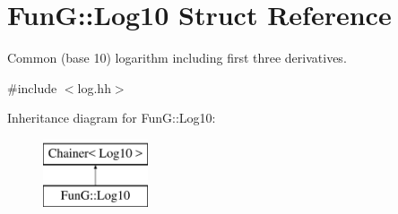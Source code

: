 \hypertarget{structFunG_1_1Log10}{\section{Fun\-G\-:\-:Log10 Struct Reference}
\label{structFunG_1_1Log10}
}


Common (base 10) logarithm including first three derivatives.  




{\ttfamily \#include $<$log.\-hh$>$}

Inheritance diagram for Fun\-G\-:\-:Log10\-:\begin{figure}[H]
\begin{center}
\leavevmode
\includegraphics[height=2.000000cm]{structFunG_1_1Log10}
\end{center}
\end{figure}
